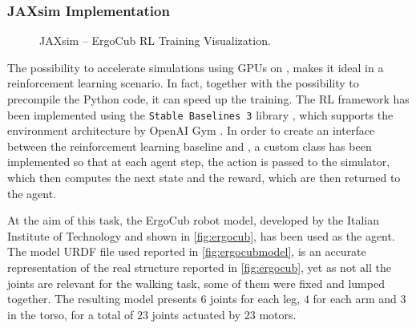 \subsubsection{JAXsim Implementation}

\begin{figure}
    \centering
    \caption{JAXsim -- ErgoCub RL Training Visualization.}
    \label{fig:ergocubtraining}
\end{figure}

The possibility to accelerate simulations using \ac{GPU}s on \jaxsim, makes it ideal in a reinforcement learning scenario. In fact, together with the possibility to precompile the Python code, it can speed up the training. The \ac{RL} framework has been implemented using the \texttt{Stable Baselines 3} library \citep{raffin_stable-baselines3_2021}, which supports the environment architecture by OpenAI Gym \citep{brockman_openai_2016}. In order to create an interface between the reinforcement learning baseline and \jaxsim, a custom class has been implemented so that at each agent step, the action is passed to the simulator, which then computes the next state and the reward, which are then returned to the agent.

At the aim of this task, the ErgoCub robot model, developed by the Italian Institute of Technology and shown in \cref{fig:ergocub}, has been used as the agent. The model \ac{URDF} file used reported in \cref{fig:ergocubmodel}, is an accurate representation of the real structure reported in \cref{fig:ergocub}, yet as not all the joints are relevant for the walking task, some of them were fixed and lumped together. The resulting model presents $6$ joints for each leg, $4$ for each arm and $3$ in the torso, for a total of $23$ joints actuated by $23$ motors.

